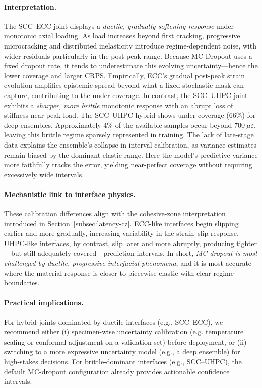 \documentclass{article}
\begin{document}
\paragraph{Interpretation.}
The SCC--ECC joint displays a \emph{ductile, gradually softening response} under monotonic axial loading. 
As load increases beyond first cracking, progressive microcracking and distributed inelasticity introduce regime-dependent noise, with wider residuals particularly in the post-peak range. 
Because MC Dropout uses a fixed dropout rate, it tends to underestimate this evolving uncertainty—hence the lower coverage and larger CRPS. 
Empirically, ECC’s gradual post-peak strain evolution amplifies epistemic spread beyond what a fixed stochastic mask can capture, contributing to the under-coverage. 
In contrast, the SCC--UHPC joint exhibits a \emph{sharper, more brittle} monotonic response with an abrupt loss of stiffness near peak load. The SCC–UHPC hybrid shows under-coverage (66\%) for deep ensembles. Approximately 4\% of the available samples occur beyond $700~\mu\varepsilon$, leaving this brittle regime sparsely represented in training. The lack of late-stage data explains the ensemble’s collapse in interval calibration, as variance estimates remain biased by the dominant elastic range.
Here the model’s predictive variance more faithfully tracks the error, yielding near-perfect coverage without requiring excessively wide intervals.


\paragraph{Mechanistic link to interface physics.} These calibration differences align with the cohesive-zone interpretation introduced in Section~\ref{subsec:latency-cz}. ECC-like interfaces begin slipping earlier and more gradually, increasing variability in the strain–slip response. UHPC-like interfaces, by contrast, slip later and more abruptly, producing tighter—but still adequately covered—prediction intervals. In short, \emph{MC dropout is most challenged by ductile, progressive interfacial phenomena}, and it is most accurate where the material response is closer to piecewise-elastic with clear regime boundaries.

\paragraph{Practical implications.} For hybrid joints dominated by ductile interfaces (e.g., SCC–ECC), we recommend either (i) specimen-wise uncertainty calibration (e.g. temperature scaling or conformal adjustment on a validation set) before deployment, or (ii) switching to a more expressive uncertainty model (e.g., a deep ensemble) for high-stakes decisions. For brittle-dominant interfaces (e.g., SCC–UHPC), the default MC-dropout configuration already provides actionable confidence intervals.
\end{document}

